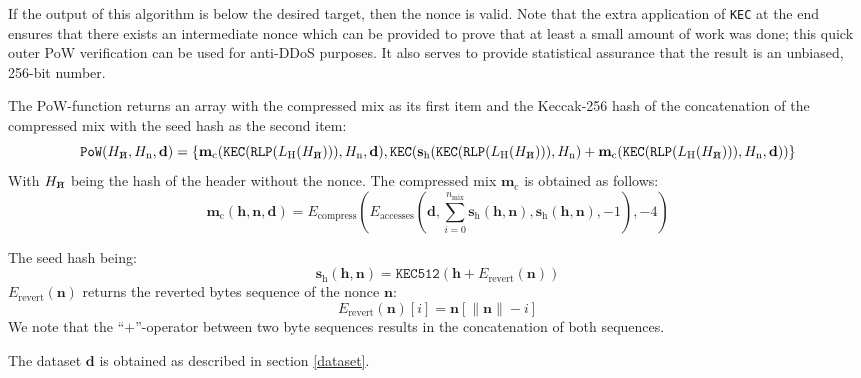 \documentclass[9pt,oneside]{amsart}
\newcommand{\hcancel}[1]{%
    \tikz[baseline=(tocancel.base)]{
        \node[inner sep=0pt,outer sep=0pt] (tocancel) {#1};
        \draw[black] (tocancel.south west) -- (tocancel.north east);
    }%
}%
\begin{document}
If the output of this algorithm is below the desired target, then the nonce is valid. Note that the extra application of \texttt{KEC} at the end ensures that there exists an intermediate nonce which can be provided to prove that at least a small amount of work was done; this quick outer PoW verification can be used for anti-DDoS purposes. It also serves to provide statistical assurance that the result is an unbiased, 256-bit number.

The PoW-function returns an array with the compressed mix as its first item and the Keccak-256 hash of the concatenation of the compressed mix with the seed hash as the second item:
\begin{equation}
 \mathtt{PoW}(H_{\hcancel{n}}, H_{\mathrm{n}}, \mathbf{d}) = \lbrace \mathbf{m}_{\mathrm{c}}(\mathtt{KEC}(\mathtt{RLP}(L_{\mathrm{H}}(H_{\hcancel{n}}))), H_{\mathrm{n}}, \mathbf{d}), \texttt{KEC}(\mathbf{s}_{\mathrm{h}}(\mathtt{KEC}(\mathtt{RLP}(L_{\mathrm{H}}(H_{\hcancel{n}}))), H_{\mathrm{n}}) + \mathbf{m}_{\mathrm{c}}(\mathtt{KEC}(\mathtt{RLP}(L_{\mathrm{H}}(H_{\hcancel{n}}))), H_{\mathrm{n}}, \mathbf{d})) \rbrace
\end{equation}
With $H_{\hcancel{n}}$ being the hash of the header without the nonce. The compressed mix $\mathbf{m}_{\mathrm{c}}$ is obtained as follows:
\begin{equation}
 \mathbf{m}_{\mathrm{c}}(\mathbf{h}, \mathbf{n}, \mathbf{d}) = E_{\mathrm{compress}}(E_{\mathrm{accesses}}(\mathbf{d}, \sum_{i = 0}^{n_{\mathrm{mix}}} \mathbf{s}_{\mathrm{h}}(\mathbf{h}, \mathbf{n}), \mathbf{s}_{\mathrm{h}}(\mathbf{h}, \mathbf{n}), -1), -4)
\end{equation}

The seed hash being:
\begin{equation}
 \mathbf{s}_{\mathrm{h}}(\mathbf{h}, \mathbf{n}) = \texttt{KEC512}(\mathbf{h} + E_{\mathrm{revert}}(\mathbf{n}))
\end{equation}
$E_{\mathrm{revert}}(\mathbf{n})$ returns the reverted bytes sequence of the nonce $\mathbf{n}$:
\begin{equation}
 E_{\mathrm{revert}}(\mathbf{n})[i] = \mathbf{n}[\lVert \mathbf{n} \rVert -i]
\end{equation}
We note that the ``$+$''-operator between two byte sequences results in the concatenation of both sequences.

The dataset $\mathbf{d}$ is obtained as described in section \ref{dataset}.
\end{document}
